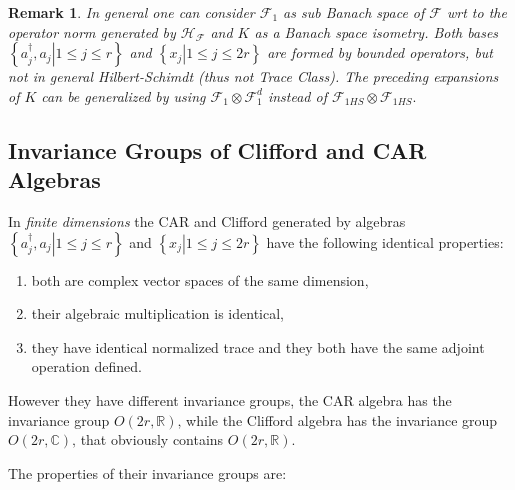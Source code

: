 \documentclass[aps, preprint]{revtex4}
\newtheorem{remark}[theorem]{Remark}
\begin{document}
\begin{remark}
In general one can consider $\mathcal{F}_{1}$ as sub Banach space of $\mathcal{F}$ wrt to the operator norm generated by $\mathcal{H}_{\mathcal{F}}$ and $K$ as a Banach space isometry. Both bases $\left \{\left .a_{j}^{ \dag } ,a_{j}\right \vert 1 \leq j \leq r\text{}\right \}$ and $\left \{\left .x_{j}\right \vert 1 \leq j \leq 2 r\text{}\right \}$ are formed by bounded operators, but not in general Hilbert-Schimdt (thus not Trace Class). The preceding expansions of $K$ can be generalized by using $\mathcal{F}_{1} \otimes \mathcal{F}_{1}^{d}$ instead of $\mathcal{F}_{1 H S} \otimes \mathcal{F}_{1 H S}\text{.}$ 
\end{remark}

\subsection{Invariance Groups of Clifford and CAR Algebras}
In \emph{finite dimensions} the CAR and Clifford generated by algebras $\left \{\left .a_{j}^{ \dag } ,a_{j}\right \vert 1 \leq j \leq r\text{}\right \}$ and $\left \{\left .x_{j}\right \vert 1 \leq j \leq 2 r\text{}\right \}$ have the following identical properties: 


\begin{enumerate}
\item both are complex vector spaces of the same dimension, 

\item their
algebraic multiplication is identical, 

\item they have identical normalized trace and they both have
the same adjoint operation defined. \end{enumerate}


However they have different invariance groups, the
CAR algebra has the invariance group $O \left (2 r ,\mathbb{R}\right )\text{,}$ while the Clifford algebra has the invariance group $O \left (2 r ,\mathbb{C}\right )\text{,}$ that obviously contains $O \left (2 r ,\mathbb{R}\right )$. 

The properties of their invariance groups are: 
\end{document}
